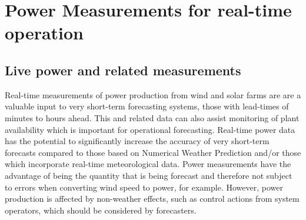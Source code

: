 \chapter{Power Measurements for real-time operation }\label{ch:power_measurements}
{\color{magenta}{Contributing author: JB, RP? }}
\label{ch:performanceassessment}

\noindent
{}




\section{Live power and related measurements}
\label{sec:power_scada}


Real-time measurements of power production from wind and solar farms are are a valuable input to very short-term forecasting systems, those with lead-times of minutes to hours ahead. This and related data can also assist monitoring of plant availability which is important for operational forecasting. Real-time power data has the potential to significantly increase the accuracy of very short-term forecasts compared to those based on Numerical Weather Prediction and/or those which incorporate real-time meteorological data. Power measurements have the advantage of being the quantity that is being forecast and therefore not subject to errors when converting wind speed to power, for example. However, power production is affected by non-weather effects, such as control actions from system operators, which should be considered by forecasters.

